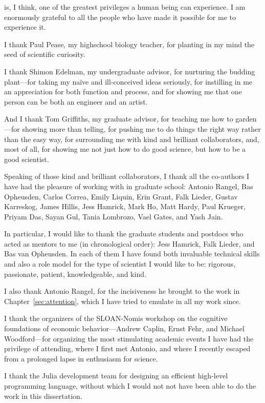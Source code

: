 
 is, I think, one of the greatest privileges a human being can experience. I am enormously grateful to all the people who have made it possible for me to experience it.

I thank Paul Pease, my highschool biology teacher, for planting in my mind the seed of scientific curiosity.

I thank Shimon Edelman, my undergraduate advisor, for nurturing the budding plant---for taking my na\"ive and ill-conceived ideas seriously, for instilling in me an appreciation for both function and process, and for showing me that one person can be both an engineer and an artist.

And I thank Tom Griffiths, my graduate advisor, for teaching me how to garden---for showing more than telling, for pushing me to do things the right way rather than the easy way, for surrounding me with kind and brilliant collaborators, and, most of all, for showing me not just how to do good science, but how to be a good scientist.

Speaking of those kind and brilliant collaborators, I thank all the co-authors I have had the pleasure of working with in graduate school: Antonio Rangel, Bas Opheusden, Carlos Correa, Emily Liquin, Erin Grant, Falk Lieder, Gustav Karreskog, James Hillis, Jess Hamrick, Mark Ho, Matt Hardy, Paul Krueger, Priyam Das, Sayan Gul, Tania Lombrozo, Vael Gates, and Yash Jain.

In particular, I would like to thank the graduate students and postdocs who acted as mentors to me (in chronological order): Jess Hamrick, Falk Lieder, and Bas van Opheusden. In each of them I have found both invaluable technical skills and also a role model for the type of scientist I would like to be: rigorous, passionate, patient, knowledgeable, and kind.

I also thank Antonio Rangel, for the incisiveness he brought to the work in Chapter~\ref{sec:attention}, which I have tried to emulate in all my work since.

I thank the organizers of the SLOAN-Nomis workshop on the cognitive foundations of economic behavior---Andrew Caplin, Ernst Fehr, and Michael Woodford---for organizing the most stimulating academic events I have had the privilege of attending, where I first met Antonio, and where I recently escaped from a prolonged lapse in enthusiasm for science.

I thank the Julia development team for designing an efficient high-level programming language, without which I would not not have been able to do the work in this dissertation.

